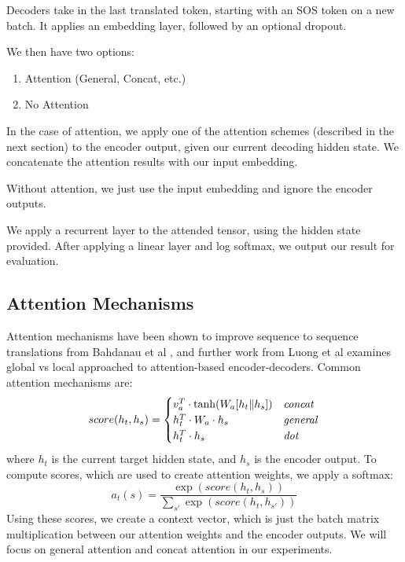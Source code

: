 \documentclass[twoside,twocolumn]{article}
\begin{document}
Decoders take in the last translated token, starting with an SOS token on a
new batch. It applies an embedding layer, followed by an optional dropout.

We then have two options:
\begin{enumerate}
  \item Attention (General, Concat, etc.)
  \item No Attention
\end{enumerate}
In the case of attention, we apply one of the attention schemes (described in
the next section) to the encoder output, given our current decoding
hidden state. We concatenate the attention results with our input embedding.

Without attention, we just use the input embedding and ignore the encoder
outputs.

We apply a recurrent layer to the attended tensor, using the hidden state
provided. After applying a linear layer and log softmax, we output our result
for evaluation.

\subsection{Attention Mechanisms}
\label{sec:attention}
Attention mechanisms have been shown to improve sequence to sequence
translations from Bahdanau et al \cite{bahdanau2014neural}, and further work
from Luong et al \cite{luong2015effective} examines global vs local approached
to attention-based encoder-decoders. Common attention mechanisms are:
\begin{equation}
    score(h_t, h_s) =
    \begin{cases}
        v_a^T \cdot \tanh (W_a [h_t \| h_s]) & \text{\emph{concat}} \\
        h_t^T \cdot W_a \cdot h_s & \text{\emph{general}} \\
        h_t^T \cdot h_s & \text{\emph{dot}} \\
    \end{cases}
\end{equation}
where $h_t$ is the current target hidden state, and $h_s$ is the encoder output.
To compute scores, which are used to create attention weights, we apply a
softmax:
\begin{equation}
  a_t(s) = \frac{\exp(score(h_t, h_s))}{\sum_{s'}\exp(score(h_t, h_{s'}))}
\end{equation}
Using these scores, we create a context vector, which is just the batch matrix
multiplication between our attention weights and the encoder outputs.
We will focus on general attention and concat attention in our
experiments.
\end{document}
